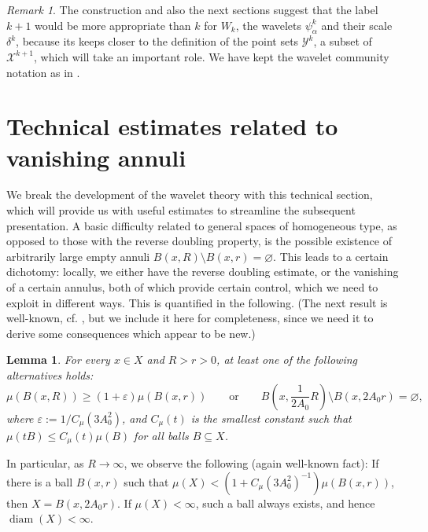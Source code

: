 \documentclass{amsart}
\numberwithin{equation}{section}
\theoremstyle{plain}
\newtheorem{lemma}[equation]{Lemma}
\theoremstyle{definition}
\theoremstyle{remark}
\newtheorem{remark}[equation]{Remark}
\begin{document}
{{{\begin{remark}
The construction and also the next sections  suggest that the label $k+1$ would be more appropriate than $k$   for $W_{k}$, the wavelets $\psi^k_{\alpha}$ and their scale $\delta ^k$, because its keeps closer to the definition of the point sets $\mathscr{Y}^k$, a subset of $\mathscr{X}^{k+1}$, which will take an important role.  We have kept the  wavelet community notation as in \cite{M2}.
\end{remark}
 
\section{Technical estimates related to vanishing annuli}
 
 We break the development of the wavelet theory with this technical section, which will provide us with useful estimates to streamline the subsequent presentation. A basic difficulty related to general spaces of homogeneous type, as opposed to those with the reverse doubling property, is the possible existence of arbitrarily large empty annuli $B(x,R)\setminus B(x,r)=\varnothing$. This leads to a certain dichotomy: locally, we either have the reverse doubling estimate, or the vanishing of a certain annulus, both of which provide certain control, which we need to exploit in different ways. This is quantified in the following. (The next result is well-known, cf. \cite[Remark 1.2]{HMY2}, but we include it here for completeness, since we need it to derive some consequences which appear to be new.)
 
\begin{lemma}\label{lem:emptyAnnulus}
For every $x\in X$ and $R>r>0$, at  least  one of the following alternatives holds:
\begin{equation*}
  \mu(B(x,R))\geq(1+\varepsilon)\mu(B(x,r))\qquad\text{or}\qquad B(x,\frac{1}{2A_{0}}R)\setminus B(x,2A_{0}r)=\varnothing,
\end{equation*}
where $\varepsilon:=1/C_\mu(3A_{0}^2)$, and $C_\mu(t)$ is the smallest constant such that $\mu(tB)\leq C_\mu(t)\mu(B)$ for all balls $B\subseteq X$. 
\end{lemma}

In particular, as $R\to\infty$, we observe the following (again well-known fact): If there is a ball $B(x,r)$ such that $\mu(X)<(1+C_\mu(3A_{0}^2)^{-1})\mu(B(x,r))$, then $X=B(x,2A_0r)$. If $\mu(X)<\infty$, such a ball always exists, and hence ${\operatorname{diam}}(X)<\infty$.

}}}
\end{document}
